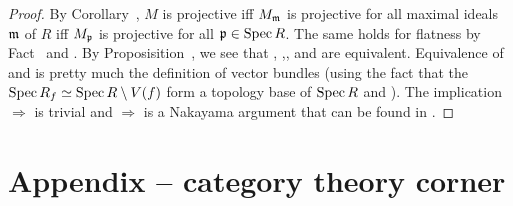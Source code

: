 \documentclass[a4paper,parskip=half,numbers=enddot, DIV=12]{scrreprt}
\begin{document}
\begin{proof}
	By Corollary~, $M$ is projective iff $M_{\mathfrak{m}}$ is projective for all maximal ideals $\mathfrak{m}$ of $R$ iff $M_{\mathfrak{p}}$ is projective for all $\mathfrak{p}\in\operatorname{Spec} R$. The same holds for flatness by Fact~ and . By Proposisition~, we see that , ,, and  are equivalent. Equivalence of  and  is pretty much the definition of vector bundles (using the fact that the $\operatorname{Spec} R_f\simeq \operatorname{Spec} R\setminus V(f)$ form a topology base of $\operatorname{Spec} R$ and \cite[Proposition~1.4.1]{alggeo1}). The implication  $\Rightarrow$  is trivial and  $\Rightarrow$  is a Nakayama argument that can be found in \cite[Corollary~1.5.1]{alg2}.
\end{proof}


\appendix
\chapter{Appendix -- category theory corner}
\setcounter{thm}{0}
\renewcommand*{\thethm}{\Alph{thm}}
\end{document}
